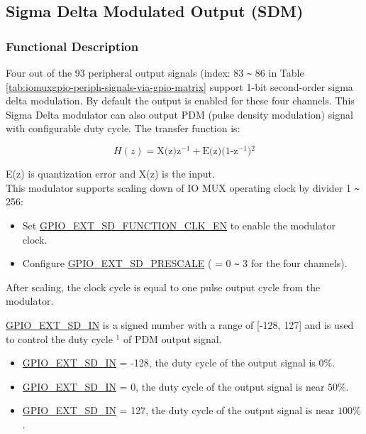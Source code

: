 \documentclass[main\_\_EN.tex]{subfiles}
\begin{document}
\subsection{Sigma Delta Modulated Output (SDM)}

\subsubsection{Functional Description}

Four out of the 93 peripheral output signals (index: 83 \verb+~+ 86 in Table \ref{tab:iomuxgpio-periph-signals-via-gpio-matrix} support 1-bit second-order sigma delta modulation. By default the output is enabled for these four channels. This Sigma Delta modulator can also output PDM (pulse density modulation) signal with configurable duty cycle. The transfer function is:

\[
    H(z)=\textrm{X(z)z$^{-1}$} + \textrm{E(z)(1-z$^{-1}$)$^{2}$}
    \]

E(z) is quantization error and X(z) is the input.\\
This modulator supports scaling down of IO MUX operating clock by divider 1 \verb+~+ 256: 
\begin{itemize}
    \item Set  \hyperref[fielddesc:GPIOSDFUNCTIONCLKEN]{GPIO\_EXT\_SD\_FUNCTION\_CLK\_EN} to enable the modulator clock.
    \item Configure \hyperref[fielddesc:GPIOSDSD0PRESCALE]{GPIO\_EXT\_SD\_PRESCALE} ( = 0 \verb+~+ 3 for the four channels).
\end{itemize}

After scaling, the clock cycle is equal to one pulse output cycle from the modulator.

\hyperref[fielddesc:GPIOSDSD0IN]{GPIO\_EXT\_SD\_IN} is a signed number with a range of [-128, 127] and is used to control the duty cycle $^{1}$ of PDM output signal.

\begin{itemize}
    \item \hyperref[fielddesc:GPIOSDSD0IN]{GPIO\_EXT\_SD\_IN} = -128, the duty cycle of the output signal is \begin{math}0\% \end{math}.
    \item \hyperref[fielddesc:GPIOSDSD0IN]{GPIO\_EXT\_SD\_IN} = 0, the duty cycle of the output signal is near \begin{math}50\% \end{math}.
    \item \hyperref[fielddesc:GPIOSDSD0IN]{GPIO\_EXT\_SD\_IN} = 127, the duty cycle of the output signal is near \begin{math}100\% \end{math}.
\end{itemize}
\end{document}
